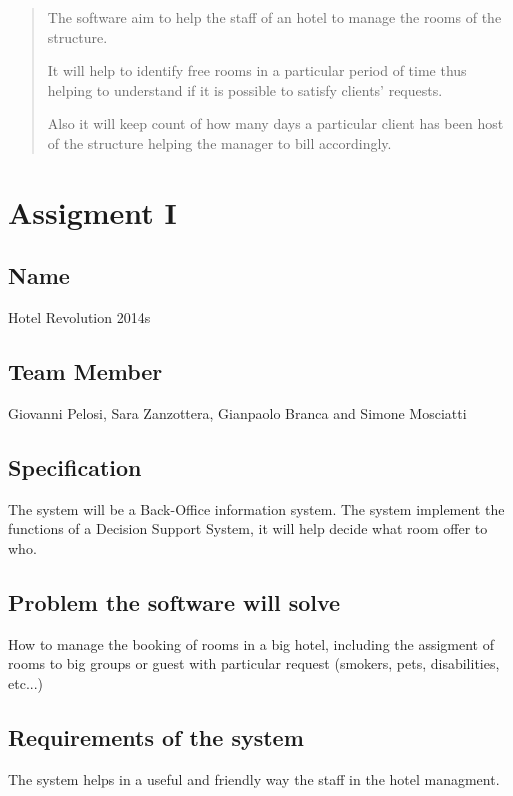 
\begin{abstract}
The software aim to help the staff of an hotel to manage the rooms of the structure.

It will help to identify free rooms in a particular period of time thus helping to understand if it is possible to satisfy clients' requests.

Also it will keep count of how many days a particular client has been host of the structure helping the manager to bill accordingly.
\end{abstract}

\section{Assigment I}

\subsection{Name}
Hotel Revolution 2014s

\subsection{Team Member}
Giovanni Pelosi, Sara Zanzottera, Gianpaolo Branca and Simone Mosciatti

\subsection{Specification}
The system will be a Back-Office information system.
The system implement the functions of a Decision Support System, it will help decide what room offer to who.

\subsection{Problem the software will solve}
How to manage the booking of rooms in a big hotel, including the assigment of rooms to big groups or guest with particular request (smokers, pets, disabilities, etc...)

\subsection{Requirements of the system}
The system helps in a useful and friendly way the staff in the hotel managment.

